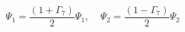 \begin{equation}
\Psi_1= \frac{(1+\Gamma_7)}{2}\Psi_1,~~~~~
\Psi_2=\frac{(1-\Gamma_7)}{2}\Psi_2
\end{equation}

